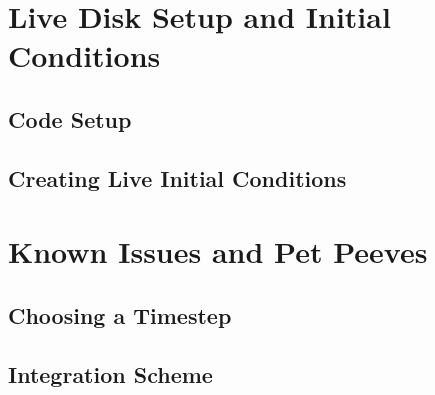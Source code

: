 \section{Live Disk Setup and Initial Conditions}

\subsection{Code Setup}
\subsection{Creating Live Initial Conditions}

\section{Known Issues and Pet Peeves}

\subsection{Choosing a Timestep}
\subsection{Integration Scheme}


